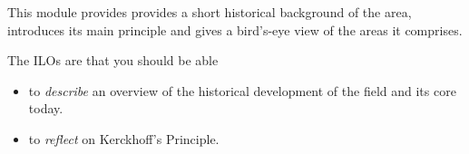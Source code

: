 This module provides provides a short historical background of the area, 
introduces its main principle and gives a bird's-eye view of the areas it 
comprises.

The \acp{ILO} are that you should be able
\begin{itemize}
  \item to \emph{describe} an overview of the historical development of the 
    field and its core today.
  \item to \emph{reflect} on Kerckhoff's Principle.
\end{itemize}

